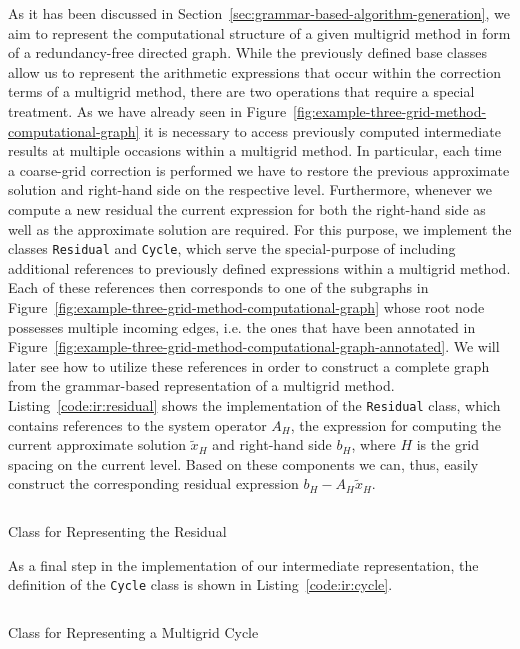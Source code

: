 As it has been discussed in Section~\ref{sec:grammar-based-algorithm-generation}, we aim to represent the computational structure of a given multigrid method in form of a redundancy-free directed graph. 
While the previously defined base classes allow us to represent the arithmetic expressions that occur within the correction terms of a multigrid method, there are two operations that require a special treatment.
As we have already seen in Figure~\ref{fig:example-three-grid-method-computational-graph} it is necessary to access previously computed intermediate results at multiple occasions within a multigrid method.
In particular, each time a coarse-grid correction is performed we have to restore the previous approximate solution and right-hand side on the respective level.
Furthermore, whenever we compute a new residual the current expression for both the right-hand side as well as the approximate solution are required.
For this purpose, we implement the classes \texttt{Residual} and \texttt{Cycle}, which serve the special-purpose of including additional references to previously defined expressions within a multigrid method.
Each of these references then corresponds to one of the subgraphs in Figure~\ref{fig:example-three-grid-method-computational-graph} whose root node possesses multiple incoming edges, i.e. the ones that have been annotated in Figure~\ref{fig:example-three-grid-method-computational-graph-annotated}.
We will later see how to utilize these references in order to construct a complete graph from the grammar-based representation of a multigrid method.
Listing~\ref{code:ir:residual} shows the implementation of the \texttt{Residual} class, which contains references to the system operator $A_H$, the expression for computing the current approximate solution $\tilde{x}_H$ and right-hand side $b_H$, where $H$ is the grid spacing on the current level.
Based on these components we can, thus, easily construct the corresponding residual expression $b_H - A_H \tilde{x}_H$.
\begin{listing}
	\inputminted{python}{evostencils/ir/residual.py}
	\caption{Class for Representing the Residual}
	\label{code:ir:residual}
\end{listing}
As a final step in the implementation of our intermediate representation, the definition of the \texttt{Cycle} class is shown in Listing~\ref{code:ir:cycle}.
\begin{listing}
	\inputminted{python}{evostencils/ir/cycle.py}
	\caption{Class for Representing a Multigrid Cycle}
	\label{code:ir:cycle}
\end{listing}
